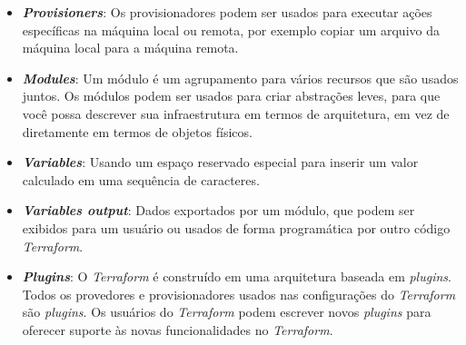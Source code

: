 \begin{itemize}
\item \textbf{\textit{Provisioners}}: Os provisionadores podem ser usados para executar ações específicas na máquina local ou remota, por exemplo copiar um arquivo da máquina local para a máquina remota.

\item \textbf{\textit{Modules}}: Um módulo é um agrupamento para vários recursos que são usados juntos. Os módulos podem ser usados para criar abstrações leves, para que você possa descrever sua infraestrutura em termos de arquitetura, em vez de diretamente em termos de objetos físicos.

\item \textbf{\textit{Variables}}: Usando um espaço reservado especial para inserir um valor calculado em uma sequência de caracteres. 

 \item \textbf{\textit{Variables output}}: Dados exportados por um módulo, que podem ser exibidos para um usuário  ou usados de forma programática por outro código \textit{Terraform}.
 
 \item \textbf{\textit{Plugins}}: O \textit{Terraform} é construído em uma arquitetura baseada em \textit{plugins}. Todos os provedores e provisionadores usados nas configurações do \textit{Terraform} são \textit{plugins}. Os usuários do \textit{Terraform} podem escrever novos \textit{plugins} para oferecer suporte às novas funcionalidades no \textit{Terraform}.
 \end{itemize}
  

